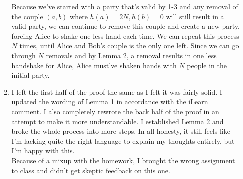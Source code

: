 \documentclass[11pt]{article}
\newcommand\tab[1][1cm]{\hspace*{#1}}
\begin{document}
\begin{enumerate}
\begin{enumerate}
\begin{longFormProof}
       \vspace*{-1em}
       \hrulefill
       \smallskip

       \step Because we've started with a party that's valid by 1-3 and any removal of the couple $(a,b)$ where $h(a)=2N, h(b)=0$ will still result in a valid party, we can continue to remove this couple and create a new party, forcing Alice to shake one less hand each time.
       \step We can repeat this process $N$ times, until Alice and Bob's couple is the only one left.
       \step Since we can go through $N$ removals and by Lemma 2, a removal results in one less handshake for Alice, Alice must've shaken hands with $N$ people in the initial party.



      \end{longFormProof}

  \item 
    I left the first half of the proof the same as I felt it was fairly solid. I 
    updated the wording of Lemma 1 in accordance with the iLearn comment. I also 
    completely rewrote the back half of the proof in an attempt to make it more 
    understandable. I established Lemma 2 and broke the whole process into more 
    steps. In all honesty, it still feels like I'm lacking quite the right language 
    to explain my thoughts entirely, but I'm happy with this.\\
    \tab Because of a mixup with the homework, I brought the wrong assignment to 
    class and didn't get skeptic feedback on this one.

  \end{enumerate}

\end{enumerate}
\end{document}
